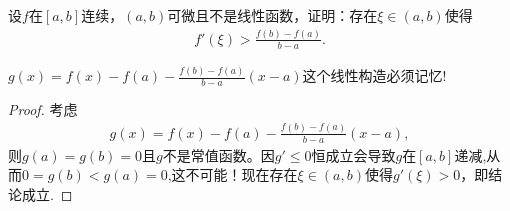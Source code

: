 \documentclass[../../main.tex]{subfiles}
\begin{document}
\begin{example}
设$f$在$[a,b]$连续，$(a,b)$可微且不是线性函数，证明：存在$\xi\in(a,b)$使得
\begin{align*}
f'(\xi) > \frac{f(b) - f(a)}{b - a}.
\end{align*}
\end{example}
\begin{note}
$g(x) = f(x) - f(a)- \frac{f(b) - f(a)}{b - a}(x - a)$这个线性构造必须记忆!
\end{note}
\begin{proof}
考虑
\begin{align*}
g(x) = f(x) - f(a)- \frac{f(b) - f(a)}{b - a}(x - a) ,
\end{align*}
则$g(a) = g(b) = 0$且$g$不是常值函数。因$g'\leqslant  0$恒成立会导致$g$在$[a,b]$递减,从而$0=g(b)<g(a)=0$,这不可能！现在存在$\xi\in(a,b)$使得$g'(\xi) > 0$，即结论成立.

\end{proof}
\end{document}
